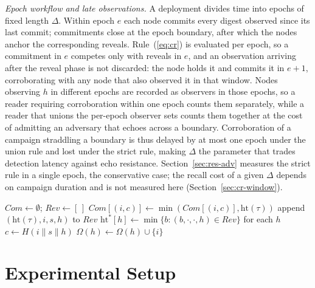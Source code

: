\documentclass[conference]{IEEEtran}
\newcommand{\Obs}{\Omega}
\begin{document}
\emph{Epoch workflow and late observations.} A deployment divides time into epochs of fixed length $\Delta$. Within epoch $e$ each node commits every digest observed since its last commit; commitments close at the epoch boundary, after which the nodes anchor the corresponding reveals. Rule~(\ref{eq:cr}) is evaluated per epoch, so a commitment in $e$ competes only with reveals in $e$, and an observation arriving after the reveal phase is not discarded: the node holds it and commits it in $e+1$, corroborating with any node that also observed it in that window. Nodes observing $h$ in different epochs are recorded as observers in those epochs, so a reader requiring corroboration within one epoch counts them separately, while a reader that unions the per-epoch observer sets counts them together at the cost of admitting an adversary that echoes across a boundary. Corroboration of a campaign straddling a boundary is thus delayed by at most one epoch under the union rule and lost under the strict rule, making $\Delta$ the parameter that trades detection latency against echo resistance. Section~\ref{sec:res-adv} measures the strict rule in a single epoch, the conservative case; the recall cost of a given $\Delta$ depends on campaign duration and is not measured here (Section~\ref{sec:cr-window}).

\begin{algorithm}[!t]
\caption{Validate commit--reveal anchors (block range $[b_0,b_1]$).}
\label{alg:cr}
\begin{algorithmic}[1]
\State $\mathit{Com}\gets\emptyset$; $\mathit{Rev}\gets[\,]$
    \State $\mathit{Com}[(i,c)]\gets\min(\mathit{Com}[(i,c)],\mathrm{ht}(\tau))$
    \State append $(\mathrm{ht}(\tau),i,s,h)$ to $\mathit{Rev}$
  \EndIf
\EndFor
\State $\mathrm{ht}^{*}[h]\gets\min\{b:(b,\cdot,\cdot,h)\in\mathit{Rev}\}$ for each $h$
  \State $c\gets H(i\|s\|h)$
    \State $\Obs(h)\gets\Obs(h)\cup\{i\}$
  \EndIf
\EndFor
\end{algorithmic}
\end{algorithm}

\section{Experimental Setup}
\label{sec:setup}
\end{document}
